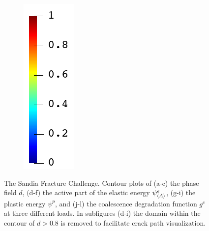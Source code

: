 \begin{figure}[!htb]
\begin{subfigure}{0.04\textwidth}
    \includegraphics[width=\textwidth,scale=0.5]{Chapter5/figures/SFC/colorbar_gc_vertical}
    \vspace{1em}
  \end{subfigure}
  \caption{The Sandia Fracture Challenge. Contour plots of (a-c) the phase field $d$, (d-f) the active part of the elastic energy $\psi^e_{\left< A \right>}$, (g-i) the plastic energy $\psi^p$, and (j-l) the coalescence degradation function $g^c$ at three different loads. In subfigures (d-i) the domain within the contour of $d>0.8$ is removed to facilitate crack path visualization. }
\end{figure}
